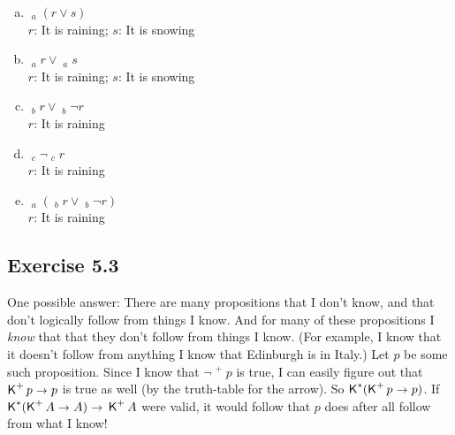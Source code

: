 \documentclass{scrartcl}
\let\oldto\to
\renewcommand\to{\scaleobj{0.95}{\,\oldto\,}}
\DeclareMathOperator{\Kn}{\mathsf{K}{}}
\begin{document}
%
%
  \begin{enumerate}[(a)]
  \item $\Kn_a(r \lor s)$\\
    $r$: It is raining; $s$: It is snowing\\[-2mm]
  \item $\Kn_a r \lor \Kn_a s$\\
    $r$: It is raining; $s$: It is snowing\\[-2mm]
  \item $\Kn_b r \lor \Kn_b \neg r$\\
    $r$: It is raining\\[-2mm]
  \item $\Kn_c \neg \Kn_c r$\\
    $r$: It is raining\\[-2mm]
  \item $\Kn_a(\Kn_b r \lor \Kn_b \neg r)$\\
    $r$: It is raining
  \end{enumerate}

\subsection*{Exercise 5.3}

%
%
  One possible answer: There are many propositions that I don't know, and that
  don't logically follow from things I know. And for many of these propositions
  I \emph{know} that that they don't follow from things I know. (For example, I
  know that it doesn't follow from anything I know that Edinburgh is in Italy.)
  Let $p$ be some such proposition. Since I know that $\neg \Kn^+ p$ is true, I
  can easily figure out that $\Kn^+ p \to p$ is true as well (by the truth-table
  for the arrow). So $\Kn^*(\Kn^+p \to p)$. If
  $\Kn^*(\Kn^+ A \to A) \to \Kn^+ A$ were valid, it would follow that $p$ does
  after all follow from what I know!
\end{document}
